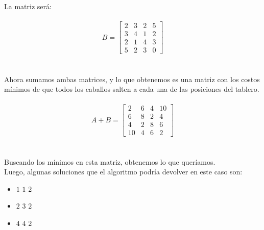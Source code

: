 {La matriz será:
\\
\\
$$B = \begin{bmatrix}
      2 & 3 & 2 & 5  \\[0.3em]
      3 & 4 & 1 & 2  \\[0.3em]
      2 & 1 & 4 & 3  \\[0.3em]
      5 & 2 & 3 & 0
\end{bmatrix}$$
\\
\\
Ahora sumamos ambas matrices, y lo que obtenemos es una matriz con los costos mínimos de que todos los caballos salten a cada una de las posiciones del tablero.
\\
\\
$$A + B =  \begin{bmatrix}
          2 & 6 & 4 & 10 \\[0.3em]
          6 & 8 & 2 & 4 \\[0.3em]
          4 & 2 & 8 & 6 \\[0.3em]
          10 & 4 & 6 & 2 
          \end{bmatrix}
          $$
\\
\\
Buscando los mínimos en esta matriz, obtenemos lo que quer\'iamos.
\\
Luego, algunas soluciones que el algoritmo podr\'ia devolver en este caso son:
\\
\begin{itemize}
\item $1$ $1$ $2$ 
\item $2$ $3$ $2$
\item $4$ $4$ $2$ 
\end{itemize}

}
